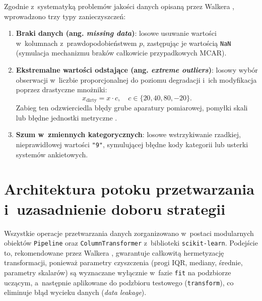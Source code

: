 Zgodnie z~systematyką problemów jakości danych opisaną przez Walkera \cite{Walker2021}, wprowadzono trzy typy zanieczyszczeń:
\begin{enumerate}
    \item \textbf{Braki danych (ang. \textit{missing data})}: losowe usuwanie wartości w~kolumnach z~prawdopodobieństwem $p$, zastępując je wartością \texttt{NaN} (symulacja mechanizmu braków całkowicie przypadkowych MCAR).
    \item \textbf{Ekstremalne wartości odstające (ang. \textit{extreme outliers})}: losowy wybór obserwacji w~liczbie proporcjonalnej do poziomu degradacji i~ich modyfikacja poprzez drastyczne mnożniki:
    \begin{equation}
    x_{\text{dirty}} = x \cdot c, \quad c \in \{20, 40, 80, -20\}.
    \end{equation}
    Zabieg ten odzwierciedla błędy grube aparatury pomiarowej, pomyłki skali lub błędne jednostki metryczne \cite{Walker2021}.
    \item \textbf{Szum w~zmiennych kategorycznych}: losowe wstrzykiwanie rzadkiej, nieprawidłowej wartości \texttt{"9"}, symulującej błędne kody kategorii lub usterki systemów ankietowych.
\end{enumerate}

\section{Architektura potoku przetwarzania i~uzasadnienie doboru strategii}
Wszystkie operacje przetwarzania danych zorganizowano w~postaci modularnych obiektów \texttt{Pipeline} oraz \texttt{ColumnTransformer} z~biblioteki \texttt{scikit-learn}. Podejście to, rekomendowane przez Walkera \cite{Walker2021}, gwarantuje całkowitą hermetyzację transformacji, ponieważ parametry czyszczenia (progi IQR, mediany, średnie, parametry skalarów) są wyznaczane wyłącznie w~fazie \texttt{fit} na podzbiorze uczącym, a~następnie aplikowane do podzbioru testowego (\texttt{transform}), co eliminuje błąd wycieku danych (\textit{data leakage}).

